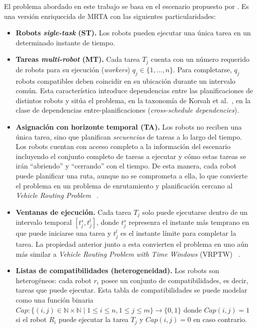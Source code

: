 El problema abordado en este trabajo se basa en el escenario propuesto por . Es una versión enriquecida de MRTA con las siguientes particularidades:

\begin{itemize}
    \item \textbf{Robots \textit{sigle-task} (ST).} Los robots pueden ejecutar una única tarea en un determinado instante de tiempo.

    \item \textbf{Tareas \textit{multi-robot} (MT).} Cada tarea $T_j$ cuenta con un número requerido de robots para su ejecución (\textit{workers}) $q_j\in \{ 1, \dots, n\}$. Para completarse, $q_j$ robots compatibles deben coincidir en su ubicación durante un intervalo común. Esta característica introduce dependencias entre las planificaciones de distintos robots y sitúa el problema, en la taxonomía de Korsah et al.~\cite{korsah2013taxonomy}, en la clase de dependencias entre-planificaciones (\textit{cross-schedule dependencies}). 

   \item \textbf{Asignación con horizonte temporal (TA).} Los robots no reciben una única tarea, sino que planifican \emph{secuencias} de tareas a lo largo del tiempo. Los robots cuentan con acceso completo a la información del escenario incluyendo el conjunto completo de tareas a ejecutar y cómo estas tareas se irán ``abriendo'' y ``cerrando'' con el tiempo. De esta manera, cada robot puede planificar una ruta, aunque no se comprometa a ella, lo que convierte el problema en un problema de enrutamiento y planificación cercano al \textit{Vehicle Routing Problem} ~\cite{tothvigo2014vehicle}.   
   
   \item \textbf{Ventanas de ejecución.} Cada tarea $T_j$ solo puede ejecutarse dentro de un intervalo temporal $[t_j^s, t_j^l]$, donde $t_j^s$ represenra el instante más temprano en que puede iniciarse una tarea y $t_j^l$ es el instante límite para completar la tarea. La propiedad anterior junto a esta convierten el problema en uno aún más similar a \textit{Vehicle Routing Problem with Time Windows} (VRPTW) ~\cite{tothvigo2014vehicle}. 
   
    \item \textbf{Listas de compatibilidades (heterogeneidad).} Los robots son heterogéneos: cada robot $r_i$ posee un conjunto de compatibilidades, es decir, tareas que puede ejecutar. Esta tabla de compatibilidades se puede modelar como una función binaria $\textit{Cap} : \{(i,j) \in \mathbb{N} \times \mathbb{N} \mid 1 \leq i \leq n, 1 \leq j \leq m\} \to \{ 0, 1 \}$ donde $\textit{Cap}(i,j) = 1$ si el robot $R_i$ puede ejecutar la tarea $T_j$ y $\textit{Cap}(i,j) = 0$ en caso contrario.
    

\end{itemize}
